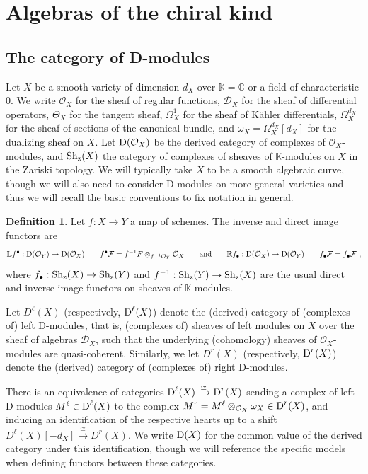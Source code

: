 \documentclass[11pt]{amsart}
\numberwithin{equation}{section}
\theoremstyle{definition}
\newtheorem{defn}[theo]{Definition}
\newcommand{\bb}{\mathbb}
\newcommand{\mc}{\mathcal}
\newcommand{\C}{{\bb C}}
\newcommand{\Sh}{{\textup{Sh}}}
\newcommand{\z}{{\textup{z}}}
\newcommand{\0}{{\textbf{0}}}
\newcommand{\Dd}{{\textup{D}}}
\newcommand{\DD}{{D}}
\def\OO{{\mc O}}
\begin{document}

\section{Algebras of the chiral kind}\label{sec:dmodules}

\subsection{The category of D-modules}\label{DModsec}

Let $X$ be a smooth variety of dimension $d_X$ over $\bb K=\C$ or a field of characteristic $0$. We write $\mc O_X$ for the sheaf of regular functions, $\mc D_X$ for the sheaf of differential operators, $\Theta_X$ for the tangent sheaf, $\Omega^1_X$ for the sheaf of K\"ahler differentials, $\Omega^{d_X}_X$ for the sheaf of sections of the canonical bundle, and $\omega_X=\Omega^{d_X}_X[d_X]$ for the dualizing sheaf on $X$. Let $\Dd(\mc O_X)$ be the derived category of complexes of $\mc O_X$-modules, and $\Sh_\z(X)$ the category of complexes of sheaves of $\bb K$-modules on $X$ in the Zariski topology. We will typically take $X$ to be a smooth algebraic curve, though we will also need to consider D-modules on more general varieties and thus we will recall the basic conventions to fix notation in general.


\begin{defn}\label{cohshvfun}
	Let $f:X\to Y$ a map of schemes. The inverse and direct image functors are
	\[ \bb L f^\bullet :\Dd(\mc O_Y) \to \Dd(\mc O_X) \qquad f^\bullet \mc F = f^{-1}F\otimes_{f^{-1}\mc O_Y} \mc O_X  \qquad\text{and}\qquad \bb R f_\bullet:\Dd(\mc O_X)\to \Dd(\mc O_Y) \qquad f_\bullet \mc F =  f_\bullet\mc F \ , \]
	where $f_\bullet:\Sh_\z(X)\to \Sh_\z(Y)$ and $f^{-1}:\Sh_\z(Y) \to \Sh_\z(X)$ are the usual direct and inverse image functors on sheaves of $\bb K$-modules.
\end{defn}

Let $\DD^\ell(X)$ (respectively, $\Dd^\ell(X)$) denote the (derived) category of (complexes of) left D-modules, that is, (complexes of) sheaves of left modules on $X$ over the sheaf of algebras $\mc D_X$, such that the underlying (cohomology) sheaves of $\mc O_X$-modules are quasi-coherent. Similarly, we let $\DD^r(X)$ (respectively, $\Dd^r(X)$) denote the (derived) category of (complexes of) right D-modules.

There is an equivalence of categories $\Dd^\ell(X)\xrightarrow{\cong} \Dd^r(X)$ sending a complex of left D-modules $M^\ell\in \Dd^\ell(X)$ to the complex $M^r=M^\ell\otimes_{\OO_X} \omega_X\in \Dd^r(X)$, and inducing an identification of the respective hearts up to a shift $\DD^\ell(X)[-d_X]\xrightarrow{\cong} \DD^r(X)$. We write $\Dd(X)$ for the common value of the derived category under this identification, though we will reference the specific models when defining functors between these categories.
\end{document}
